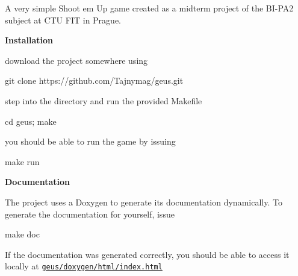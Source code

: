 A very simple Shoot em Up game created as a midterm project of the B\+I-\/\+P\+A2 subject at C\+TU F\+IT in Prague.

{\bfseries Installation}


\begin{DoxyItemize}
\item download the project somewhere using \begin{DoxyVerb}  git clone https://github.com/Tajnymag/geus.git
\end{DoxyVerb}

\item step into the directory and run the provided Makefile \begin{DoxyVerb}  cd geus;
  make
\end{DoxyVerb}

\item you should be able to run the game by issuing \begin{DoxyVerb}  make run
\end{DoxyVerb}

\end{DoxyItemize}

{\bfseries Documentation}

The project uses a Doxygen to generate it\textquotesingle{}s documentation dynamically. To generate the documentation for yourself, issue \begin{DoxyVerb}make doc
\end{DoxyVerb}


If the documentation was generated correctly, you should be able to access it locally at \href{doxygen/html/index.html}{\tt geus/doxygen/html/index.\+html} 